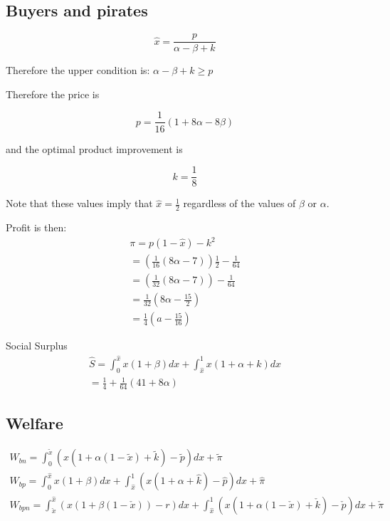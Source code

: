 \documentclass{article}
\begin{document}
\subsection{Buyers and pirates}

\begin{equation*}
\hat{x} = \frac{p}{\alpha-\beta + k}
\end{equation*}

Therefore the upper condition is: $\alpha-\beta+k \geq p$

Therefore the price is 

\begin{equation*}
p = \frac{1}{16}\left(
1+8\alpha-8\beta
\right)
\end{equation*}

and the optimal product improvement is 

\begin{equation*}
k = \frac{1}{8}
\end{equation*}

Note that these values imply that $\hat{x} = \frac{1}{2}$ regardless of the values of $\beta$ or $\alpha$. 

Profit is then: 
\begin{align*}
\pi = p(1-\hat{x})-k^2 \\
= \left(\frac{1}{16}\left(
8\alpha-7
\right)\right) \frac{1}{2} -\frac{1}{64} \\
= \left(\frac{1}{32}\left(
8\alpha-7
\right)\right) -\frac{1}{64} \\
= \frac{1}{32} \left(
8\alpha- \frac{15}{2}
 \right) \\
= \frac{1}{4}(a-\frac{15}{16})
\end{align*}

Social Surplus
\begin{align*}
\hat{S} = \int_0^{\hat{x}}x(1+\beta)dx+
\int_{\hat{x}}^{1}x(1+\alpha+k)dx \\
=\frac{1}{4} +
\frac{1}{64}\left(41+8 \alpha \right)
\end{align*}

\subsection{Welfare}

\begin{align*}
W_{bn} = \int^{\tilde{x}}_0 \left(x(1+\alpha(1-\tilde{x})+\tilde{k})-\tilde{p} \right) dx + \tilde{\pi}  \\
W_{bp} = \int^{\hat{x}}_0 x(1+\beta) dx +\int^{1}_{\hat{x}} \left(x(1+\alpha+\hat{k}) - \hat{p} \right) dx + \hat{\pi} \\
W_{bpn} = 
\int^{\hat{x}}_{\check{x}} \left(x(1+\beta(1-\check{x}))-r \right)dx +\int^{1}_{\hat{x}} \left(x(1+\alpha(1-\check{x})+\check{k}) - \check{p} \right) dx + \check{\pi}
\end{align*}
\end{document}

